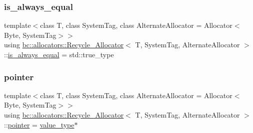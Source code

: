 \subsubsection{\texorpdfstring{is\+\_\+always\+\_\+equal}{is\_always\_equal}}
{\footnotesize\ttfamily template$<$class T, class System\+Tag, class Alternate\+Allocator = Allocator$<$\+Byte, System\+Tag$>$$>$ \\
using \hyperlink{structbc_1_1allocators_1_1Recycle__Allocator}{bc\+::allocators\+::\+Recycle\+\_\+\+Allocator}$<$ T, System\+Tag, Alternate\+Allocator $>$\+::\hyperlink{structbc_1_1allocators_1_1Recycle__Allocator_a411361c7c7a3aadec6020692a32b774b}{is\+\_\+always\+\_\+equal} =  std\+::true\+\_\+type}

\mbox{\label{structbc_1_1allocators_1_1Recycle__Allocator_ae0c8b71f7d2d0ae5cc5637659ca7bbb5}} 
\subsubsection{\texorpdfstring{pointer}{pointer}}
{\footnotesize\ttfamily template$<$class T, class System\+Tag, class Alternate\+Allocator = Allocator$<$\+Byte, System\+Tag$>$$>$ \\
using \hyperlink{structbc_1_1allocators_1_1Recycle__Allocator}{bc\+::allocators\+::\+Recycle\+\_\+\+Allocator}$<$ T, System\+Tag, Alternate\+Allocator $>$\+::\hyperlink{structbc_1_1allocators_1_1Recycle__Allocator_ae0c8b71f7d2d0ae5cc5637659ca7bbb5}{pointer} =  \hyperlink{structbc_1_1allocators_1_1Recycle__Allocator_af461967c55249583cda104fdf7a79fc9}{value\+\_\+type}$\ast$}

\mbox{\label{structbc_1_1allocators_1_1Recycle__Allocator_a7b02963c13d9f948b1d3895f8631e711}} 
